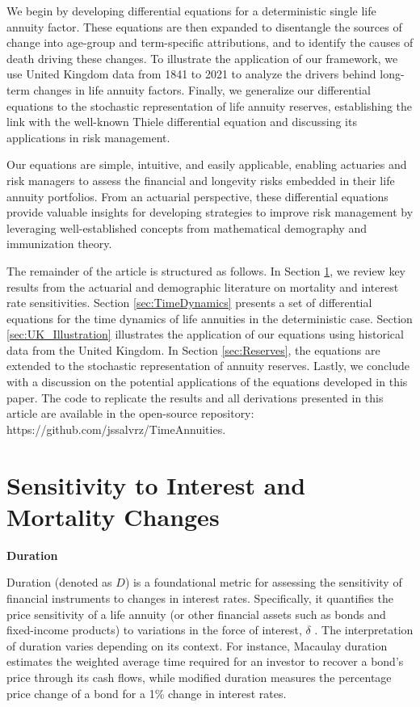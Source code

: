 \documentclass[12pt]{article}
\begin{document}
We begin by developing differential equations for a deterministic single life annuity factor. These equations are then expanded to disentangle the sources of change into age-group and term-specific attributions, and to identify the causes of death driving these changes. To illustrate the application of our framework, we use United Kingdom data from 1841 to 2021 to analyze the drivers behind long-term changes in life annuity factors. Finally, we generalize our differential equations to the stochastic representation of life annuity reserves, establishing the link with the well-known Thiele differential equation and discussing its applications in risk management.

Our equations are simple, intuitive, and easily applicable, enabling actuaries and risk managers to assess the financial and longevity risks embedded in their life annuity portfolios. From an actuarial perspective, these differential equations provide valuable insights for developing strategies to improve risk management by leveraging well-established concepts from mathematical demography and immunization theory.

The remainder of the article is structured as follows. In Section \ref{sec:SensitivityMortalityInterest}, we review key results from the actuarial and demographic literature on mortality and interest rate sensitivities. Section \ref{sec:TimeDynamics} presents a set of differential equations for the time dynamics of life annuities in the deterministic case. Section \ref{sec:UK_Illustration} illustrates the application of our equations using historical data from the United Kingdom.  In Section \ref{sec:Reserves}, the equations are extended to the stochastic representation of annuity reserves. Lastly, we conclude with a discussion on the potential applications of the equations developed in this paper. The code to replicate the results and all derivations presented in this article are available in the open-source repository: https://github.com/jssalvrz/TimeAnnuities.



\section{Sensitivity to Interest and Mortality Changes}\label{sec:SensitivityMortalityInterest}

\textbf{Duration}

Duration (denoted as $D$) is a foundational metric for assessing the sensitivity of financial instruments to changes in interest rates. Specifically, it quantifies the price sensitivity of a life annuity (or other financial assets such as bonds and fixed-income products) to variations in the force of interest, $\delta$ \citep{milevsky2013life,charupat2016sluggish}. The interpretation of duration varies depending on its context. For instance, Macaulay duration estimates the weighted average time required for an investor to recover a bond's price through its cash flows, while modified duration measures the percentage price change of a bond for a 1\% change in interest rates.
\end{document}
